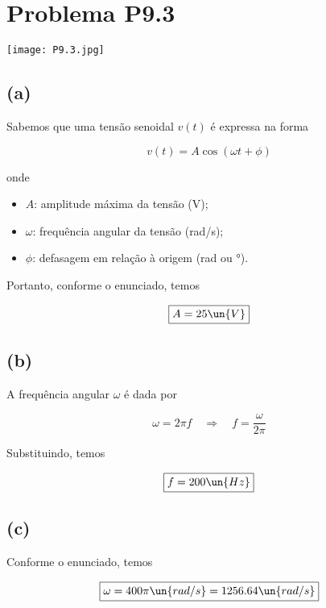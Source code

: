 
\section*{Problema P9.3}

\renewcommand*\thesection{9.3}

\begin{center}
    \texttt{[image: P9.3.jpg]}
\end{center}

\subsection*{(a)}

Sabemos que uma tensão senoidal $v(t)$ é expressa na forma


\begin{equation}\label{eq:9.3.1}
    v(t) = A\cos\left(\omega t + \phi\right)
\end{equation}

onde

\begin{itemize}
    \item $A$: amplitude máxima da tensão (V);
    \item $\omega$: frequência angular da tensão (rad/s);
    \item $\phi$: defasagem em relação à origem (rad ou °).
\end{itemize}

Portanto, conforme o enunciado, temos

\[ \boxed{A = 25 \un{V}}  \]

\subsection*{(b)}

A frequência angular $\omega$ é dada por

\[ \omega = 2\pi f \quad \Rightarrow \quad f = \frac{\omega}{2\pi} \]

Substituindo, temos

\[ \boxed{f = 200 \un{Hz}}  \]

\subsection*{(c)}

Conforme o enunciado, temos

\[ \boxed{\omega = 400\pi \un{rad/s} = 1256.64 \un{rad/s}}  \]

